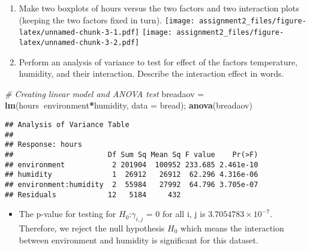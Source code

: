 \documentclass[]{article}
\newenvironment{Shaded}{\begin{snugshade}}{\end{snugshade}}
\newcommand{\CommentTok}[1]{\textcolor[rgb]{0.56,0.35,0.01}{\textit{#1}}}
\newcommand{\DataTypeTok}[1]{\textcolor[rgb]{0.13,0.29,0.53}{#1}}
\newcommand{\DecValTok}[1]{\textcolor[rgb]{0.00,0.00,0.81}{#1}}
\newcommand{\KeywordTok}[1]{\textcolor[rgb]{0.13,0.29,0.53}{\textbf{#1}}}
\newcommand{\NormalTok}[1]{#1}
\newcommand{\OperatorTok}[1]{\textcolor[rgb]{0.81,0.36,0.00}{\textbf{#1}}}
\newcommand{\StringTok}[1]{\textcolor[rgb]{0.31,0.60,0.02}{#1}}
\providecommand{\tightlist}{%
  \setlength{\itemsep}{0pt}\setlength{\parskip}{0pt}}
\begin{document}
\begin{enumerate}
\def\labelenumi{\alph{enumi})}
\setcounter{enumi}{1}
\item
  Make two boxplots of hours versus the two factors and two interaction
  plots (keeping the two factors fixed in turn).
  \texttt{[image: assignment2\_files/figure-latex/unnamed-chunk-3-1.pdf]}
  \texttt{[image: assignment2\_files/figure-latex/unnamed-chunk-3-2.pdf]}
\item
  Perform an analysis of variance to test for effect of the factors
  temperature, humidity, and their interaction. Describe the interaction
  effect in words.
\end{enumerate}

\begin{Shaded}
\begin{Highlighting}[]
\CommentTok{# Creating linear model and ANOVA test}
\NormalTok{breadaov =}\StringTok{ }\KeywordTok{lm}\NormalTok{(hours}\OperatorTok{~}\NormalTok{environment}\OperatorTok{*}\NormalTok{humidity, }\DataTypeTok{data =}\NormalTok{ bread); }\KeywordTok{anova}\NormalTok{(breadaov)}
\end{Highlighting}
\end{Shaded}

\begin{verbatim}
## Analysis of Variance Table
## 
## Response: hours
##                      Df Sum Sq Mean Sq F value    Pr(>F)
## environment           2 201904  100952 233.685 2.461e-10
## humidity              1  26912   26912  62.296 4.316e-06
## environment:humidity  2  55984   27992  64.796 3.705e-07
## Residuals            12   5184     432
\end{verbatim}

\begin{Shaded}
\end{Shaded}

\begin{itemize}
\tightlist
\item
  The p-value for testing for \(H_{0}\):\(\gamma_{i,j}\) = 0 for all i,
  j is \ensuremath{3.7054783\times 10^{-7}}. Therefore, we reject the
  null hypothesis \(H_{0}\) which means the interaction between
  environment and humidity is significant for this dataset.
\end{itemize}
\end{document}
